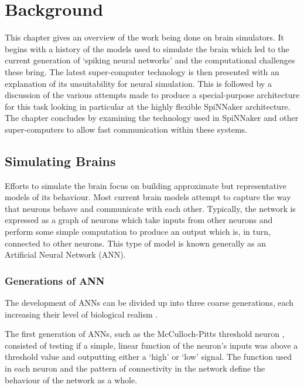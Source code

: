 \chapter{Background}
	\label{chap:background}
	
	This chapter gives an overview of the work being done on brain simulators. It
	begins with a history of the models used to simulate the brain which led to
	the current generation of `spiking neural networks' and the computational
	challenges these bring. The latest super-computer technology is then presented
	with an explanation of its unsuitability for neural simulation. This is
	followed by a discussion of the various attempts made to produce a
	special-purpose architecture for this task looking in particular at the highly
	flexible SpiNNaker architecture. The chapter concludes by examining the
	technology used in SpiNNaker and other super-computers to allow fast
	communication within these systems.
	
	\section{Simulating Brains}
		
		\label{sec:simulating-brains}
		
		
		Efforts to simulate the brain focus on building approximate but
		representative models of its behaviour. Most current brain models attempt to
		capture the way that neurons behave and communicate with each other.
		Typically, the network is expressed as a graph of neurons which take inputs
		from other neurons and perform some simple computation to produce an output
		which is, in turn, connected to other neurons. This type of model is known
		generally as an Artificial Neural Network (ANN).
		
		\subsection{Generations of ANN}
			
			The development of ANNs can be divided up into three coarse generations,
			each increasing their level of biological realism \cite{vainbrand11}.
			
			The first generation of ANNs, such as the McCulloch-Pitts threshold neuron
			\cite{mcculloch43}, consisted of testing if a simple, linear function of
			the neuron's inputs was above a threshold value and outputting either a
			`high' or `low' signal. The function used in each neuron and the pattern
			of connectivity in the network define the behaviour of the network as a
			whole.
			
